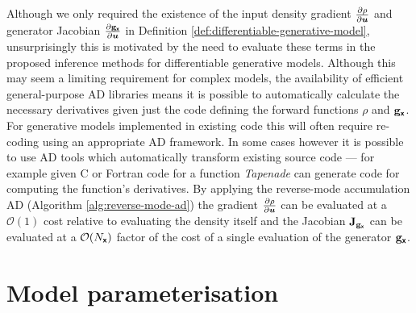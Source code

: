 Although we only required the existence of the input density gradient $\frac{\partial \rho}{\partial \boldsymbol{u}}$ and generator Jacobian $\frac{\partial {\mathbf{g}}_{\boldsymbol{\mathsf{x}}}}{\partial \boldsymbol{u}}$ in Definition \ref{def:differentiable-generative-model}, unsurprisingly this is motivated by the need to evaluate these terms in the proposed inference methods for differentiable generative models. Although this may seem a limiting requirement for complex models, the availability of efficient general-purpose \ac{AD} libraries \citep{baydin2015automatic} means it is possible to automatically calculate the necessary derivatives given just the code defining the forward functions $\rho$ and ${\mathbf{g}}_{\boldsymbol{\mathsf{x}}}$. For generative models implemented in existing code this will often require re-coding using an appropriate \ac{AD} framework. In some cases however it is possible to use \ac{AD} tools which automatically transform existing source code --- for example given C or Fortran code for a function \emph{Tapenade} \citep{hascoet2013tapenade} can generate code for computing the function's derivatives. By applying the reverse-mode accumulation \ac{AD} (Algorithm \ref{alg:reverse-mode-ad}) the gradient $\frac{\partial \rho}{\partial \boldsymbol{u}}$  can be evaluated at a $\mathcal{O}(1)$ cost relative to evaluating the density itself and the Jacobian $\mathbf{J}_{{\mathbf{g}}_{\boldsymbol{\mathsf{x}}}}$ can be evaluated at a $\mathcal{O}(N_{\boldsymbol{\mathsf{x}}})$ factor of the cost of a single evaluation of the generator ${\mathbf{g}}_{\boldsymbol{\mathsf{x}}}$.


\section{Model parameterisation}\label{sec:model-parameterisation}

